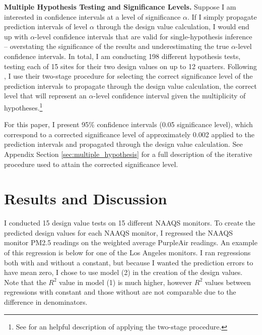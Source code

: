 \documentclass[12pt]{article}
\begin{document}
\textbf{Multiple Hypothesis Testing and Significance Levels.} Suppose I am interested in confidence intervals at a level of significance $\alpha$. If I simply propagate prediction intervals of level $\alpha$ through the design value calculation, I would end up with $\alpha$-level confidence intervals that are valid for single-hypothesis inference -- overstating the significance of the results and underestimating the true $\alpha$-level confidence intervals. In total, I am conducting 198 different hypothesis tests, testing each of 15 sites for their two design values on up to 12 quarters. Following \cite{benjamini_adaptive_2006}, I use their two-stage procedure for selecting the correct significance level of the prediction intervals to propagate through the design value calculation, the correct level that will represent an $\alpha$-level confidence interval given the multiplicity of hypotheses.\footnote{See \cite{anderson_multiple_2008} for an helpful description of applying the two-stage procedure.}

For this paper, I present 95\% confidence intervals (0.05 significance level), which correspond to a corrected significance level of approximately 0.002 applied to the prediction intervals and propagated through the design value calculation. See Appendix Section \ref{sec:multiple_hypothesis} for a full description of the iterative procedure used to attain the corrected significance level.








\section{Results and Discussion}
\label{results}
I conducted 15 design value tests on 15 different NAAQS monitors. To create the predicted design values for each NAAQS monitor, I regressed the NAAQS monitor PM2.5 readings on the weighted average PurpleAir readings. An example of this regression is below for one of the Los Angeles monitors. I ran regressions both with and without a constant, but because I wanted the prediction errors to have mean zero, I chose to use model (2) in the creation of the design values. Note that the $R^2$ value in model (1) is much higher, however $R^2$ values between regressions with constant and those without are not comparable due to the difference in denominators. 

\end{document}
